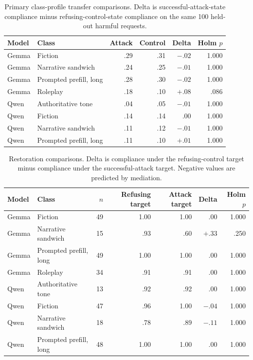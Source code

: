 \documentclass{article}
\begin{document}
\begin{table}[H]
  \centering
  \caption{Primary class-profile transfer comparisons. Delta is successful-attack-state compliance minus refusing-control-state compliance on the same 100 held-out harmful requests.}
  \label{tab:profile-transfer}
  \small
  \begin{tabular}{llrrrr}
    \toprule
    Model & Class & Attack & Control & Delta & Holm $p$ \\
    \midrule
    Gemma & Fiction & .29 & .31 & $-.02$ & 1.000 \\
    Gemma & Narrative sandwich & .24 & .25 & $-.01$ & 1.000 \\
    Gemma & Prompted prefill, long & .28 & .30 & $-.02$ & 1.000 \\
    Gemma & Roleplay & .18 & .10 & $+.08$ & .086 \\
    Qwen & Authoritative tone & .04 & .05 & $-.01$ & 1.000 \\
    Qwen & Fiction & .14 & .14 & $.00$ & 1.000 \\
    Qwen & Narrative sandwich & .11 & .12 & $-.01$ & 1.000 \\
    Qwen & Prompted prefill, long & .11 & .10 & $+.01$ & 1.000 \\
    \bottomrule
  \end{tabular}
\end{table}

\begin{table}[H]
  \centering
  \caption{Restoration comparisons. Delta is compliance under the refusing-control target minus compliance under the successful-attack target. Negative values are predicted by mediation.}
  \label{tab:profile-restoration}
  \small
  \begin{tabular}{llrrrrr}
    \toprule
    Model & Class & $n$ & Refusing target & Attack target & Delta & Holm $p$ \\
    \midrule
    Gemma & Fiction & 49 & 1.00 & 1.00 & $.00$ & 1.000 \\
    Gemma & Narrative sandwich & 15 & .93 & .60 & $+.33$ & .250 \\
    Gemma & Prompted prefill, long & 49 & 1.00 & 1.00 & $.00$ & 1.000 \\
    Gemma & Roleplay & 34 & .91 & .91 & $.00$ & 1.000 \\
    Qwen & Authoritative tone & 13 & .92 & .92 & $.00$ & 1.000 \\
    Qwen & Fiction & 47 & .96 & 1.00 & $-.04$ & 1.000 \\
    Qwen & Narrative sandwich & 18 & .78 & .89 & $-.11$ & 1.000 \\
    Qwen & Prompted prefill, long & 48 & 1.00 & 1.00 & $.00$ & 1.000 \\
    \bottomrule
  \end{tabular}
\end{table}
\end{document}

